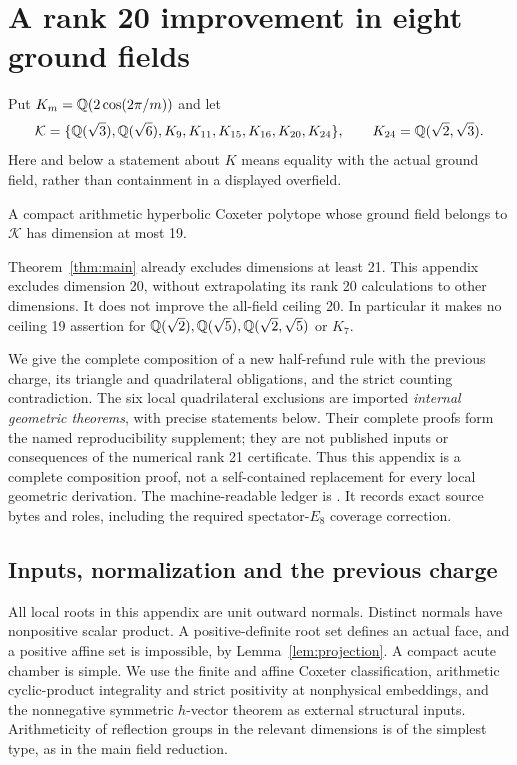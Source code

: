 \appendix
\section{A rank 20 improvement in eight ground fields}\label{app:eight}

Put $K_m=\mathbb Q(2\cos(2\pi/m))$ and let
\[
 \mathcal K=\{\mathbb Q(\sqrt3),\mathbb Q(\sqrt6),K_9,K_{11},K_{15},K_{16},K_{20},K_{24}\},
 \qquad K_{24}=\mathbb Q(\sqrt2,\sqrt3).
\]
Here and below a statement about $K$ means equality with the actual
ground field, rather than containment in a displayed overfield.
\begin{theorem}\label{thm:eight19}
A compact arithmetic hyperbolic Coxeter polytope whose ground field
belongs to $\mathcal K$ has dimension at most 19.
\end{theorem}
Theorem~\ref{thm:main} already excludes dimensions at least 21. This
appendix excludes dimension 20, without extrapolating its rank 20
calculations to other dimensions. It does not improve the all-field
ceiling 20. In particular it makes no ceiling 19 assertion for
$\mathbb Q(\sqrt2),\mathbb Q(\sqrt5),\mathbb Q(\sqrt2,\sqrt5)$ or $K_7$.

We give the complete composition of a new half-refund rule with the
previous charge, its triangle and quadrilateral obligations, and the
strict counting contradiction. The six local quadrilateral exclusions
are imported \emph{internal geometric theorems}, with precise statements
below. Their complete proofs form the named reproducibility supplement;
they are not published inputs or consequences of the numerical rank 21
certificate. Thus this appendix is a complete composition proof, not a
self-contained replacement for every local geometric derivation.
The machine-readable ledger is
.
It records exact source bytes and roles, including the required
spectator-$E_8$ coverage correction.

\subsection{Inputs, normalization and the previous charge}
All local roots in this appendix are unit outward normals. Distinct
normals have nonpositive scalar product. A positive-definite root set
defines an actual face, and a positive affine set is impossible, by
Lemma~\ref{lem:projection}. A compact acute chamber is simple. We use
the finite and affine Coxeter classification, arithmetic cyclic-product
integrality and strict positivity at nonphysical embeddings, and the
nonnegative symmetric $h$-vector theorem as external structural inputs.
Arithmeticity of reflection groups in the relevant dimensions is of
the simplest type, as in the main field reduction.

